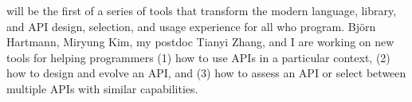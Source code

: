 \documentclass[justified]{tufte-handout}
\begin{document}
 will be the first of a series of tools that transform the modern language, library, and API design, selection, and usage experience for all who program. Björn Hartmann, Miryung Kim, my postdoc Tianyi Zhang, and I are working on new tools for helping programmers (1) how to use APIs in a particular context, (2) how to design and evolve an API, and (3) how to assess an API or select between multiple APIs with similar capabilities.
\end{document}
